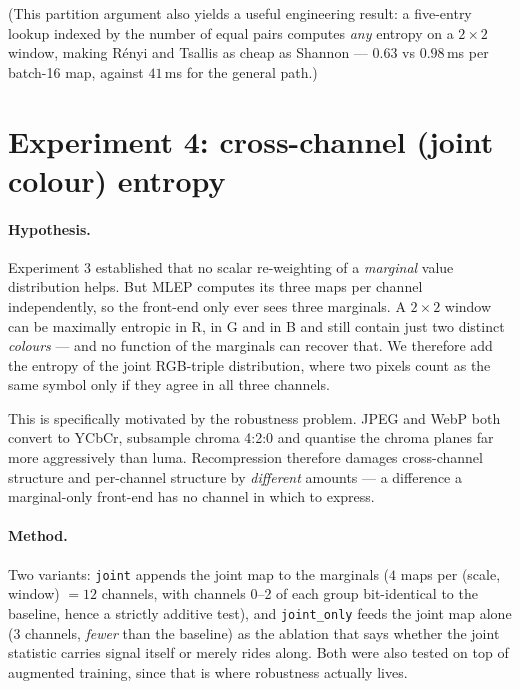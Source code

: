 (This partition argument also yields a useful engineering result: a five-entry
lookup indexed by the number of equal pairs computes \emph{any} entropy on a
$2\times2$ window, making Rényi and Tsallis as cheap as Shannon --- $0.63$ vs
$0.98$\,ms per batch-16 map, against $41$\,ms for the general path.)

\section{Experiment 4: cross-channel (joint colour) entropy}
\label{sec:exp-color}

\paragraph{Hypothesis.} Experiment 3 established that no scalar re-weighting of
a \emph{marginal} value distribution helps. But MLEP computes its three maps
per channel independently, so the front-end only ever sees three marginals. A
$2\times2$ window can be maximally entropic in R, in G and in B and still
contain just two distinct \emph{colours} --- and no function of the marginals
can recover that. We therefore add the entropy of the joint RGB-triple
distribution, where two pixels count as the same symbol only if they agree in
all three channels.

This is specifically motivated by the robustness problem. JPEG and WebP both
convert to YCbCr, subsample chroma 4:2:0 and quantise the chroma planes far more
aggressively than luma. Recompression therefore damages cross-channel structure
and per-channel structure by \emph{different} amounts --- a difference a
marginal-only front-end has no channel in which to express.

\paragraph{Method.} Two variants: \texttt{joint} appends the joint map to the
marginals ($4$ maps per (scale, window) $=12$ channels, with channels 0--2 of
each group bit-identical to the baseline, hence a strictly additive test), and
\texttt{joint\_only} feeds the joint map alone ($3$ channels, \emph{fewer} than
the baseline) as the ablation that says whether the joint statistic carries
signal itself or merely rides along. Both were also tested on top of augmented
training, since that is where robustness actually lives.

